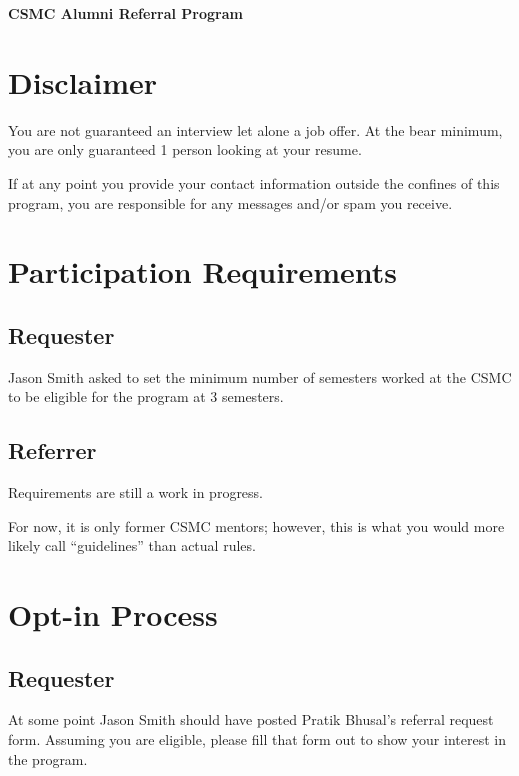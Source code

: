 \documentclass[letterpaper, 12pt]{article}
\newcommand{\minSemesters}{3}
\newcommand{\currentBoss}{Jason Smith}
\begin{document}
\begin{center}
    \bfseries\Large CSMC Alumni Referral Program
\end{center}

\doublespacing{}

\section{Disclaimer}\label{section:disclaimer}

You are not guaranteed an interview let alone a job offer. At the bear minimum,
you are only guaranteed 1 person looking at your resume.

If at any point you provide your contact information outside the confines of
this program, you are responsible for any messages and/or spam you
receive.\label{section:disclaimer:spamMessages}

\section{Participation Requirements}

\subsection{Requester}

\currentBoss{} asked to set the minimum number of semesters worked at the
CSMC to be eligible for the program at \minSemesters{} semesters.

\subsection{Referrer}

Requirements are still a work in progress.

For now, it is only former CSMC mentors; however, this is what you would more
likely call ``guidelines'' than actual rules.

\section{Opt-in Process}

\subsection{Requester}

At some point \currentBoss{} should have posted Pratik Bhusal's referral request form. Assuming you are eligible, please fill that form
out to show your interest in the program.
\end{document}
